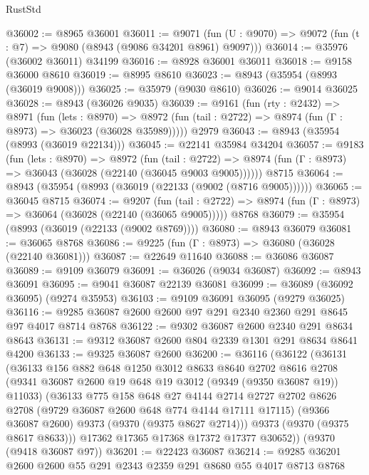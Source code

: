 \begin{lexlean}{RustStd}
\begin{coremodule}
@36002 := @8965 @36001
@36011 := @9071
    (fun (U : @9070) => @9072 (fun (t : @7) => @9080 (@8943 (@9086 @34201 @8961) @9097)))
@36014 := @35976 (@36002 @36011) @34199
@36016 := @8928 @36001 @36011
@36018 := @9158 @36000 @8610
@36019 := @8995 @8610
@36023 := @8943 (@35954 (@8993 (@36019 @9008)))
@36025 := @35979 (@9030 @8610)
@36026 := @9014 @36025
@36028 := @8943 (@36026 @9035)
@36039 := @9161
    (fun (rty : @2432) =>
    @8971
      (fun (lets : @8970) =>
      @8972 (fun (tail : @2722) => @8974 (fun (Γ : @8973) => @36023 (@36028 @35989)))))
    @2979
@36043 := @8943 (@35954 (@8993 (@36019 @22134)))
@36045 := @22141 @35984 @34204
@36057 := @9183
    (fun (lets : @8970) =>
    @8972
      (fun (tail : @2722) =>
      @8974 (fun (Γ : @8973) => @36043 (@36028 (@22140 (@36045 @9003 @9005))))))
    @8715
@36064 := @8943 (@35954 (@8993 (@36019 (@22133 (@9002 (@8716 @9005))))))
@36065 := @36045 @8715
@36074 := @9207
    (fun (tail : @2722) => @8974 (fun (Γ : @8973) => @36064 (@36028 (@22140 (@36065 @9005)))))
    @8768
@36079 := @35954 (@8993 (@36019 (@22133 (@9002 @8769))))
@36080 := @8943 @36079
@36081 := @36065 @8768
@36086 := @9225 (fun (Γ : @8973) => @36080 (@36028 (@22140 @36081)))
@36087 := @22649 @11640
@36088 := @36086 @36087
@36089 := @9109 @36079
@36091 := @36026 (@9034 @36087)
@36092 := @8943 @36091
@36095 := @9041 @36087 @22139 @36081
@36099 := @36089 (@36092 @36095) (@9274 @35953)
@36103 := @9109 @36091 @36095 (@9279 @36025)
@36116 := @9285 @36087 @2600 @2600 @97 @291 @2340 @2360 @291 @8645 @97 @4017 @8714 @8768
@36122 := @9302 @36087 @2600 @2340 @291 @8634 @8643
@36131 := @9312 @36087 @2600 @804 @2339 @1301 @291 @8634 @8641 @4200
@36133 := @9325 @36087 @2600
@36200 := @36116
    (@36122
      (@36131
        (@36133
          @156
          @882
          @648
          @1250
          @3012
          @8633
          @8640
          @2702
          @8616
          @2708
          (@9341 @36087 @2600 @19 @648 @19 @3012 (@9349 (@9350 @36087 @19)) @11033)
          (@36133
            @775
            @158
            @648
            @27
            @4144
            @2714
            @2727
            @2702
            @8626
            @2708
            (@9729 @36087 @2600 @648 @774 @4144 @17111 @17115)
            (@9366 @36087 @2600)
            @9373
            (@9370 (@9375 @8627 @2714)))
          @9373
          (@9370 (@9375 @8617 @8633)))
        @17362
        @17365
        @17368
        @17372
        @17377
        @30652))
    (@9370 (@9418 @36087 @97))
@36201 := @22423 @36087
@36214 := @9285 @36201 @2600 @2600 @55 @291 @2343 @2359 @291 @8680 @55 @4017 @8713 @8768

\end{coremodule}
\end{lexlean}
